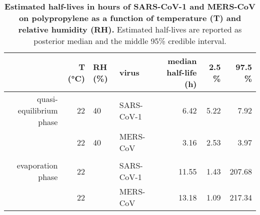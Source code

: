 \begin{table}[ht]
\centering
\caption{\textbf{Estimated half-lives in hours of SARS-CoV-1 and MERS-CoV on polypropylene as a function of temperature (T) and relative humidity (RH).} Estimated half-lives are reported as posterior median and the middle 95\% credible interval.} 
\label{tab:sars-mers-halflives}
\begingroup\small
\begin{tabular}{rrllrrr}
  \hline
 & T (\si{\celsius}) & RH (\si{\%}) & virus & median half-life (h) & 2.5 \si{\%} & 97.5 \si{\%} \\ 
  \hline
quasi-equilibrium phase & 22 & 40 & SARS-CoV-1 & 6.42 & 5.22 & 7.92 \\ 
   & 22 & 40 & MERS-CoV & 3.16 & 2.53 & 3.97 \\ 
   \\ 
evaporation phase & 22 &  & SARS-CoV-1 & 11.55 & 1.43 & 207.68 \\ 
   & 22 &  & MERS-CoV & 13.18 & 1.09 & 217.34 \\ 
   \hline
\end{tabular}
\endgroup
\end{table}
